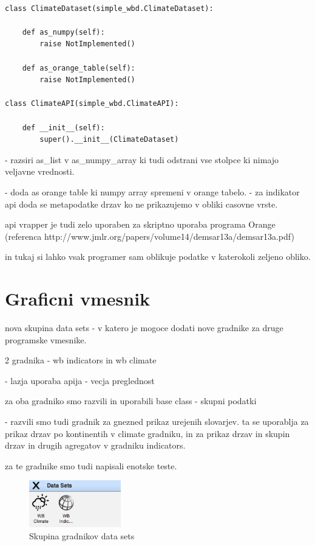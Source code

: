 \begin{verbatim}

class ClimateDataset(simple_wbd.ClimateDataset):
    
    def as_numpy(self):
        raise NotImplemented()
    
    def as_orange_table(self):
        raise NotImplemented()

class ClimateAPI(simple_wbd.ClimateAPI):

    def __init__(self):
        super().__init__(ClimateDataset)
\end{verbatim}


- razsiri as\_list v as\_numpy\_array ki tudi odstrani vse stolpce ki nimajo 
  veljavne vrednosti.

- doda as orange table ki numpy array spremeni v orange tabelo.
  - za indikator api doda se metapodatke drzav ko ne prikazujemo v obliki casovne vrste.


api vrapper je tudi zelo uporaben za skriptno uporaba programa Orange 
(referenca http://www.jmlr.org/papers/volume14/demsar13a/demsar13a.pdf)

in tukaj si lahko vsak programer sam oblikuje podatke v katerokoli zeljeno obliko.






\section{Graficni vmesnik}


 
nova skupina data sets 
 - v katero je mogoce dodati nove gradnike za druge programske vmesnike.

2 gradnika - wb indicators in wb climate

- lazja uporaba apija
- vecja preglednost


za oba gradniko smo razvili in uporabili base class - skupni podatki

- razvili smo tudi gradnik za gnezned prikaz urejenih slovarjev.
  ta se uporablja za prikaz drzav po kontinentih v climate gradniku,
  in za prikaz drzav in skupin drzav in drugih agregatov v gradniku
  indicators.


za te gradnike smo tudi napisali enotske teste.


\begin{figure}
  \begin{center}
    \includegraphics[width=4cm]{pic/data_sets_group.png}
  \end{center}
  \caption{Skupina gradnikov data sets}
  \label{drevo}
\end{figure} 


